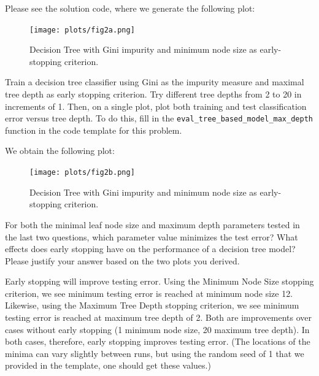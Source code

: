 \begin{solution}
Please see the solution code, where we generate the following plot:
    \begin{figure}[H]
    \begin{center}
    \texttt{[image: plots/fig2a.png]}
    \caption{Decision Tree with Gini impurity and minimum node size as early-stopping criterion.}
    \end{center}
    \end{figure}
\end{solution}

\problem[7]
Train a decision tree classifier using Gini as the impurity measure and maximal tree depth as early stopping criterion. Try different tree depths from 2 to 20 in increments of 1. Then, on a single plot, plot both training and test classification error versus tree depth. To do this, fill in the \texttt{eval_tree_based_model_max_depth} function in the code template for this problem.

\begin{solution}
    We obtain the following plot:
    \begin{figure}[H]
    \begin{center}
    \texttt{[image: plots/fig2b.png]}
    \caption{Decision Tree with Gini impurity and minimum node size as early-stopping criterion.}
    \end{center}
    \end{figure}
\end{solution}

\problem[4]
For both the minimal leaf node size and maximum depth parameters tested in the last two questions, which parameter value minimizes the test error? What effects does early stopping have on the performance of a decision tree model?
Please justify your answer based on the two plots you derived.

\begin{solution}
    Early stopping will improve testing error. Using the Minimum Node Size stopping criterion, we see minimum testing error is reached at minimum node size 12. Likewise, using the Maximum Tree Depth stopping criterion, we see minimum testing error is reached at maximum tree depth of 2. Both are improvements over cases without early stopping (1 minimum node size, 20 maximum tree depth). In both cases, therefore, early stopping improves testing error. (The locations of the minima can vary slightly between runs, but using the random seed of 1 that we provided in the template, one should get these values.)
\end{solution}

